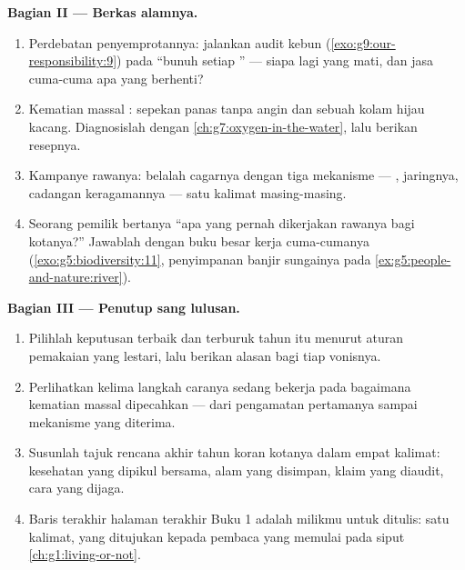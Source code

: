 \begin{problem}
\medskip\noindent\textbf{Bagian II --- Berkas alamnya.}
\begin{enumerate}[resume]
  \item Perdebatan penyemprotannya: jalankan audit kebun
         (\cref{exo:g9:our-responsibility:9}) pada
        ``bunuh setiap '' --- siapa lagi yang mati,
        dan jasa cuma-cuma apa yang berhenti?
  \item Kematian massal : sepekan panas tanpa angin
        dan sebuah kolam hijau kacang. Diagnosislah dengan
        \cref{ch:g7:oxygen-in-the-water}, lalu berikan
        resepnya.
  \item Kampanye rawanya: belalah cagarnya dengan tiga
        mekanisme --- , jaringnya, cadangan
        keragamannya --- satu kalimat masing-masing.
  \item Seorang pemilik  bertanya ``apa yang pernah
        dikerjakan rawanya bagi kotanya?'' Jawablah dengan
        buku besar kerja cuma-cumanya
        (\cref{exo:g5:biodiversity:11}, penyimpanan banjir
        sungainya pada \cref{ex:g5:people-and-nature:river}).
\end{enumerate}

\medskip\noindent\textbf{Bagian III --- Penutup sang
lulusan.}
\begin{enumerate}[resume]
  \item Pilihlah keputusan terbaik dan terburuk tahun itu
        menurut aturan pemakaian yang lestari, lalu berikan
        alasan bagi tiap vonisnya.
  \item Perlihatkan kelima langkah caranya sedang bekerja
        pada bagaimana kematian massal  dipecahkan
        --- dari pengamatan pertamanya sampai mekanisme yang
        diterima.
  \item Susunlah tajuk rencana akhir tahun koran kotanya
        dalam empat kalimat: kesehatan yang dipikul bersama,
        alam yang disimpan, klaim yang diaudit, cara yang
        dijaga.
  \item Baris terakhir halaman terakhir Buku 1 adalah
        milikmu untuk ditulis: satu kalimat, yang ditujukan
        kepada pembaca yang memulai pada siput
        \cref{ch:g1:living-or-not}.
\end{enumerate}
\end{problem}
